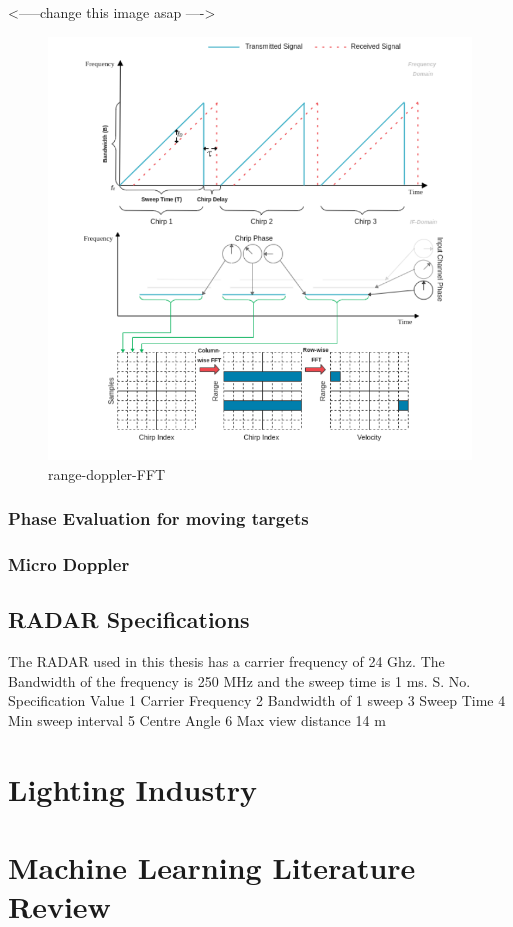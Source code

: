<-----change this image asap ---->
 \begin{figure}[ht]
  \begin{center}
    \includegraphics[width=1\textwidth]{Master's thesis/images/range-doppler-FFT.PNG} 
    \caption{range-doppler-FFT}
    \label{fig:range-doppler-FFT}
  \end{center}
\end{figure}  










\subsubsection{Phase Evaluation for moving targets}
\subsubsection{Micro Doppler}


\subsection{RADAR Specifications}
The RADAR used in this thesis has a carrier frequency of 24 Ghz. The Bandwidth of the frequency is 250 MHz and the sweep time is 1 ms.
S. No.	Specification	Value
1	Carrier Frequency	
2	Bandwidth of 1 sweep	
3	Sweep Time	
4	Min sweep interval	
5	Centre Angle	
6	Max view distance 	14 m
		
\section{Lighting Industry}
\section{Machine Learning Literature Review}




